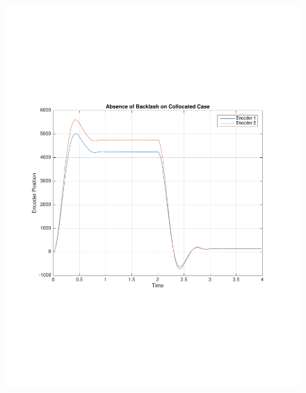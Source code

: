 \documentclass[11pt, a4paper]{article}
\begin{document}
\begin{figure}[H]
\centering
\includegraphics[width = \textwidth]{13.pdf}
\end{figure}
\end{document}
